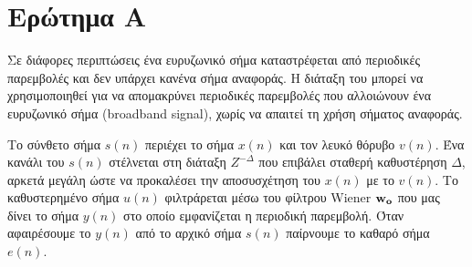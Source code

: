 \section{Ερώτημα Α}\label{section:A}
Σε διάφορες περιπτώσεις ένα ευρυζωνικό σήμα καταστρέφεται από περιοδικές παρεμβολές και δεν υπάρχει κανένα σήμα αναφοράς.
Η διάταξη του 
μπορεί να χρησιμοποιηθεί για να απομακρύνει περιοδικές παρεμβολές που
αλλοιώνουν ένα ευρυζωνικό σήμα (broadband signal), χωρίς να απαιτεί τη χρήση σήματος αναφοράς.

Το σύνθετο σήμα $s(n)$ περιέχει το σήμα $x(n)$ και τον λευκό θόρυβο $v(n)$.
Ένα κανάλι του $s(n)$ στέλνεται στη διάταξη $Z^{-\Delta}$ που επιβάλει σταθερή καθυστέρηση $\Delta$, αρκετά μεγάλη ώστε να προκαλέσει την αποσυσχέτηση του $x(n)$ με το $v(n)$.
Το καθυστερημένο σήμα $u(n)$ φιλτράρεται μέσω του φίλτρου Wiener $\mathbf{w_o}$ που μας δίνει το σήμα $y(n)$ στο οποίο εμφανίζεται η περιοδική παρεμβολή. Όταν αφαιρέσουμε το $y(n)$ από το αρχικό σήμα $s(n)$ παίρνουμε το καθαρό σήμα $e(n)$.

